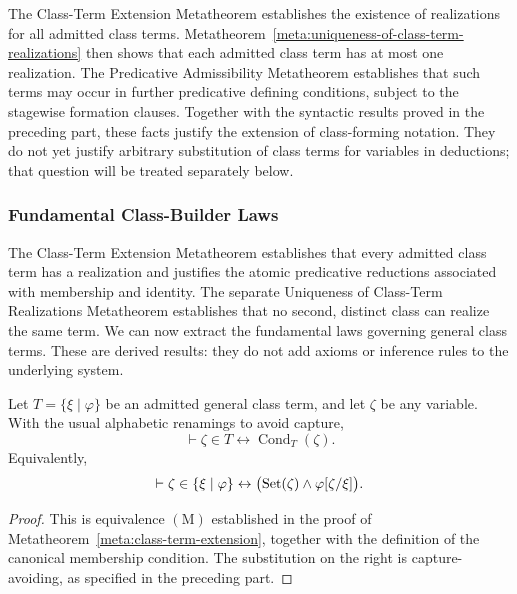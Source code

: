 The Class-Term Extension Metatheorem establishes the existence of
realizations for all admitted class terms. Metatheorem~\ref{meta:uniqueness-of-class-term-realizations}
then shows that each admitted class term has at most one realization.
The Predicative Admissibility Metatheorem establishes that such terms
may occur in further predicative defining conditions, subject to the
stagewise formation clauses. Together with the syntactic results
proved in the preceding part, these facts justify the extension of
class-forming notation. They do not yet justify arbitrary
substitution of class terms for variables in deductions; that
question will be treated separately below.



\subsubsection{Fundamental Class-Builder Laws}
\label{sec:fundamental-class-builder-laws}


The Class-Term Extension Metatheorem establishes that every admitted
class term has a realization and justifies the atomic predicative
reductions associated with membership and identity. The separate
Uniqueness of Class-Term Realizations Metatheorem establishes that
no second, distinct class can realize the same term. We can now
extract the fundamental laws governing general class terms.
These are derived results: they do not add axioms or inference rules
to the underlying system.

\begin{metatheorem}
\label{meta:membership-law-for-class-terms}
Let \(T=\{\xi\mid\varphi\}\) be an admitted general class term,
and let \(\zeta\) be any variable. With the usual alphabetic
renamings to avoid capture,
\[
\vdash
\zeta\in T
\leftrightarrow
\operatorname{Cond}_T(\zeta).
\]
Equivalently,
\[
\vdash
\zeta\in\{\xi\mid\varphi\}
\leftrightarrow
\bigl(\operatorname{Set}(\zeta)\land\varphi[\zeta/\xi]\bigr).
\]
\end{metatheorem}

\begin{proof}
This is equivalence \((\mathrm{M})\) established in the proof of
Metatheorem~\ref{meta:class-term-extension}, together with the
definition of the canonical membership condition. The substitution
on the right is capture-avoiding, as specified in the preceding part.
\end{proof}

